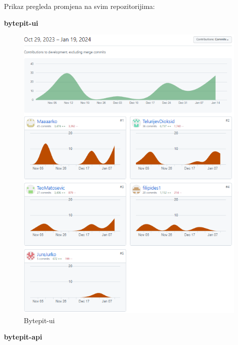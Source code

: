 		\noindent Prikaz pregleda promjena na svim repozitorijima:
		\begin{packed_enum}
			\item \textbf{bytepit-ui}
			
			\begin{figure}[H]
				\includegraphics[scale=0.75]{slike/bp-ui-contr.PNG} 
				\centering
				\caption{Bytepit-ui}
				\label{fig:bytepit-ui}
			\end{figure}
			
			\eject
			
			\item \textbf{bytepit-api}
			

\end{packed_enum}
